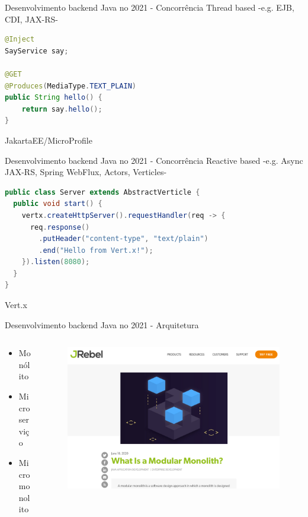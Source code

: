 \documentclass[aspectratio=169]{beamer}
\begin{document}
\begin{frame}[fragile]{Desenvolvimento backend Java no 2021 - Concorrência}
Thread based -e.g. EJB, CDI, JAX-RS-
\begin{lstlisting}[language=Java]
@Inject
SayService say;

@GET
@Produces(MediaType.TEXT_PLAIN)
public String hello() {
    return say.hello();
}
\end{lstlisting}

JakartaEE/MicroProfile
\end{frame}


\begin{frame}[fragile]{Desenvolvimento backend Java no 2021 - Concorrência}
Reactive based -e.g. Async JAX-RS, Spring WebFlux, Actors, Verticles-
\begin{lstlisting}[language=Java]
public class Server extends AbstractVerticle {
  public void start() {
    vertx.createHttpServer().requestHandler(req -> {
      req.response()
        .putHeader("content-type", "text/plain")
        .end("Hello from Vert.x!");
    }).listen(8080);
  }
}
\end{lstlisting}
Vert.x
\end{frame}


\begin{frame}{Desenvolvimento backend Java no 2021 - Arquitetura}

\begin{columns}
\begin{column}{0.5\textwidth}
\begin{itemize}
	\item Monólito
    \item Microserviço
    \item Micromonolito
\end{itemize}
\end{column}
\begin{column}{0.5\textwidth}  %
\begin{figure}
	\centering
	\includegraphics[width=0.9\linewidth]{Images/micromonolito.png}
\end{figure}
\end{column}
\end{columns}

\end{frame}
\end{document}
